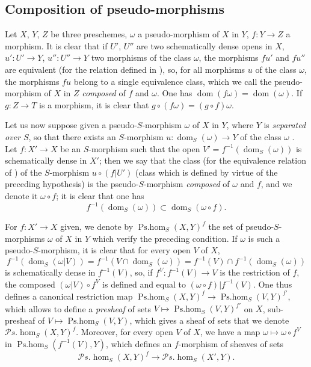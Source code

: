 \subsection{Composition of pseudo-morphisms}
\label{IV.20.3}

\begin{env}[20.3.1]
\label{IV.20.3.1}
Let $X$, $Y$, $Z$ be three preschemes, $\omega$ a pseudo-morphism of $X$ in $Y$, $f:Y\to Z$ a morphism.
It is clear that if $U'$, $U''$ are two schematically dense opens in $X$, $u':U'\to Y$, $u'':U''\to Y$ two morphisms of the class $\omega$, the morphisms $fu'$ and $fu''$ are equivalent (for the relation defined in ), so, for all morphisms $u$ of the class $\omega$, the morphisms $fu$ belong to a single equivalence class, which we call the pseudo-morphism of $X$ in $Z$ \emph{composed} of $f$ and $\omega$.
One has $\operatorname{dom}(f\omega)=\operatorname{dom}(\omega)$.
If $g:Z\to T$ is a morphism, it is clear that $g\circ(f\omega)=(g\circ f)\omega$.
\end{env}

\begin{env}[20.3.2]
\label{IV.20.3.2}
Let us now suppose given a pseudo-$S$-morphism $\omega$ of $X$ in $Y$, where $Y$ is \emph{separated over $S$}, so that there exists an $S$-morphism $u:\operatorname{dom}_S(\omega)\to Y$ of the class $\omega$ .
Let $f:X'\to X$ be an $S$-morphism such that the open $V'=f^{-1}(\operatorname{dom}_S(\omega))$ is schematically dense in $X'$;
then we say that the class (for the equivalence relation of ) of the $S$-morphism $u\circ(f|U')$ (class which is defined by virtue of the preceding hypothesis) is the pseudo-$S$-morphism \emph{composed} of $\omega$ and $f$, and we denote it $\omega\circ f$;
it is clear that one has
\[
\label{IV.20.3.2.1}
  f^{-1}(\operatorname{dom}_S(\omega))\subset\operatorname{dom}_S(\omega\circ f).
  \tag{20.3.2.1}
\]

For $f:X'\to X$ given, we denote by $\operatorname{Ps.hom}_S(X,Y)^f$ the set of pseudo-$S$-morphisms $\omega$ of $X$ in $Y$ which verify the preceding condition.
If $\omega$ is such a pseudo-$S$-morphism, it is clear that for every open $V$ of $X$,
\[
  f^{-1}(\operatorname{dom}_S(\omega|V))=f^{-1}(V\cap\operatorname{dom}_S(\omega))=f^{-1}(V)\cap f^{-1}(\operatorname{dom}_S(\omega))
\]
is schematically dense in $f^{-1}(V)$, so, if $f^V:f^{-1}(V)\to V$ is the restriction of $f$, the composed $(\omega|V)\circ f^V$ is defined and equal to $(\omega\circ f)|f^{-1}(V)$.
One thus defines a canonical restriction map $\operatorname{Ps.hom}_S(X,Y)^f\to\operatorname{Ps.hom}_S(V,Y)^{f'}$, which
allows to define a \emph{presheaf} of sets $V\mapsto\operatorname{Ps.hom}_S(V,Y)^{f'}$ on $X$, sub-presheaf of $V\mapsto\operatorname{Ps.hom}_S(V,Y)$, which gives a sheaf of sets that we denote $\mathscr{P}\!s.\!\operatorname{hom}_S(X,Y)^f$.
Moreover, for every open $V$ of $X$, we have a map $\omega\mapsto\omega\circ f^V$ in $\operatorname{Ps.hom}_S(f^{-1}(V),Y)$, which defines an $f$-morphism of sheaves of sets
\[
  \mathscr{P}\!s.\!\operatorname{hom}_S(X,Y)^f\to\mathscr{P}\!s.\!\operatorname{hom}_S(X',Y).
\]
\end{env}

